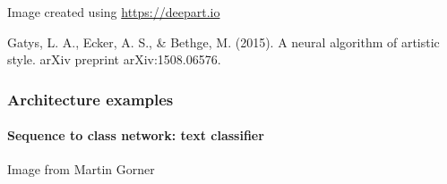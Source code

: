 \documentclass[9pt]{beamer}
\begin{document}
\begin{frame}
  \bigskip

  {\footnotesize Image created using \url{https://deepart.io}}

  \medskip

  {\footnotesize Gatys, L. A., Ecker, A. S., \& Bethge, M. (2015). A
    neural algorithm of artistic style. arXiv preprint
    arXiv:1508.06576.}

\end{frame}





\begin{frame}
  \frametitle{Architecture examples}

  \framesubtitle{Sequence to class network: text classifier}

  \begin{center}
  \end{center}

  {\small Image from Martin Gorner}
\end{frame}
\end{document}
